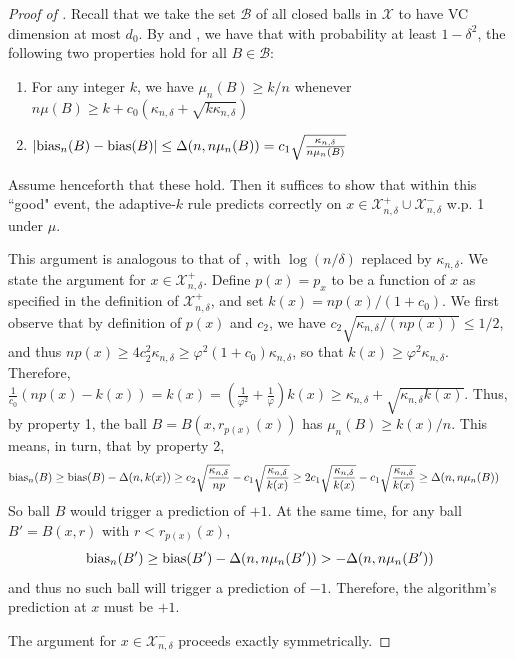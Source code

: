 \documentclass{article}
\def\X{{\mathcal X}}
\def\B{{\mathcal B}}
\def\bias{{\rm bias}}
\begin{document}
\begin{proof}[Proof of ]
Recall that we take the set $\B$ of all closed balls in $\X$ to have VC dimension at most $d_0$. 
By  and , we have that with probability at least $1-\delta^2$, the following two properties hold for all $B \in \B$:
\begin{enumerate}
\item For any integer $k$, we have $\mu_n(B) \geq k/n$ whenever $n \mu(B) \geq k + c_0 \left( \kappa_{n, \delta} + \sqrt{k \kappa_{n, \delta}} \right)$
\item $|\bias_n(B) - \bias(B)| \leq \Delta(n, n \mu_n(B)) = c_1 \sqrt{\frac{\kappa_{n, \delta}}{n \mu_n(B)}}$
\end{enumerate}
Assume henceforth that these hold. Then it suffices to show that within this ``good" event, the adaptive-$k$ rule predicts correctly on $x \in \X^+_{n,\delta} \cup \X^-_{n,\delta}$ w.p. 1 under $\mu$. 

This argument is analogous to that of , with $\log (n/\delta)$ replaced by $\kappa_{n, \delta}$. We state the argument for $x \in \X^+_{n,\delta}$. Define $p(x) = p_x$ to be a function of $x$ as specified in the definition of $\X^+_{n,\delta}$, and set $k(x) = np(x) / (1 + c_0)$. We first observe that by definition of $p(x)$ and $c_2$, we have $c_2 \sqrt{\kappa_{n, \delta}/(n p(x))} \leq 1/2$, and thus $np(x) \geq 4 c_2^2 \kappa_{n, \delta} \geq \varphi^2 (1+c_0) \kappa_{n, \delta}$, so that $k(x) \geq \varphi^2 \kappa_{n, \delta}$. Therefore, $\frac{1}{c_0} (np(x) - k(x)) = k(x) = \left( \frac{1}{\varphi^2} + \frac{1}{\varphi} \right) k(x) \geq \kappa_{n, \delta} + \sqrt{ \kappa_{n, \delta} k(x) }$. Thus, by property 1, the ball $B = B(x, r_{p(x)} (x))$ has $\mu_n(B) \geq k(x)/n$. This means, in turn, that by property 2, 
\begin{align*}
\bias_n(B) &\geq \bias(B) - \Delta(n, k(x) ) 
\geq c_2 \sqrt{\frac{\kappa_{n, \delta}}{np}} - c_1 \sqrt{\frac{\kappa_{n, \delta}}{k(x)}} 
\geq 2c_1 \sqrt{\frac{\kappa_{n, \delta}}{k(x)}} - c_1 \sqrt{\frac{\kappa_{n, \delta}}{k(x)}} 
\geq \Delta(n, n \mu_n(B))
\end{align*}
So ball $B$ would trigger a prediction of $+1$.
At the same time, for any ball $B' = B(x, r)$ with $r < r_{p(x)} (x)$,
$$ \bias_n(B') \geq \bias(B') - \Delta(n, n \mu_n(B')) > -\Delta(n, n \mu_n(B')) $$
and thus no such ball will trigger a prediction of $-1$. Therefore, the algorithm's prediction at $x$ must be $+1$.

The argument for $x \in \X^-_{n,\delta}$ proceeds exactly symmetrically. 
\end{proof}
\end{document}

